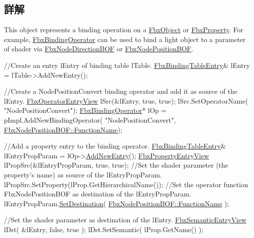 \subsection{詳解}
This object represents a binding operation on a \hyperlink{class_fbx_object}{Fbx\+Object} or \hyperlink{class_fbx_property}{Fbx\+Property}. For example, \hyperlink{class_fbx_binding_operator}{Fbx\+Binding\+Operator} can be used to bind a light object to a parameter of shader via \hyperlink{class_fbx_node_direction_b_o_f}{Fbx\+Node\+Direction\+B\+OF} or \hyperlink{class_fbx_node_position_b_o_f}{Fbx\+Node\+Position\+B\+OF}. 
\begin{DoxyCode}
\textcolor{comment}{//Create an entry lEntry of binding table lTable.}
\hyperlink{class_fbx_binding_table_entry}{FbxBindingTableEntry}& lEntry = lTable->AddNewEntry();

\textcolor{comment}{//Create a NodePositionConvert binding operator and add it as source of the lEntry.}
\hyperlink{class_fbx_operator_entry_view}{FbxOperatorEntryView} lSrc(&lEntry, \textcolor{keyword}{true}, \textcolor{keyword}{true});
lSrc.SetOperatorName( \textcolor{stringliteral}{"NodePositionConvert"});
\hyperlink{class_fbx_binding_operator}{FbxBindingOperator}* lOp = pImpl.AddNewBindingOperator( \textcolor{stringliteral}{"NodePositionConvert"}, 
      \hyperlink{class_fbx_node_position_b_o_f_aaa0c4610384d1dbb4e566bad44c356ee}{FbxNodePositionBOF::FunctionName});

\textcolor{comment}{//Add a property entry to the binding operator.}
\hyperlink{class_fbx_binding_table_entry}{FbxBindingTableEntry}& lEntryPropParam = lOp->\hyperlink{class_fbx_binding_table_base_a2ebf180e80538abf0e6512a8ca30ee10}{AddNewEntry}();
\hyperlink{class_fbx_property_entry_view}{FbxPropertyEntryView} lPropSrc(&lEntryPropParam, \textcolor{keyword}{true}, \textcolor{keyword}{true});
\textcolor{comment}{//Set the shader parameter (the property's name) as source of the lEntryPropParam.}
lPropSrc.SetProperty(lProp.GetHierarchicalName());
\textcolor{comment}{//Set the operator function FbxNodePositionBOF as destination of the lEntryPropParam.}
lEntryPropParam.\hyperlink{class_fbx_binding_table_entry_aaa49a62bd197febfb6052f3efa50eaf3}{SetDestination}( \hyperlink{class_fbx_node_position_b_o_f_aaa0c4610384d1dbb4e566bad44c356ee}{FbxNodePositionBOF::FunctionName}
       );

\textcolor{comment}{//Set the shader parameter as destination of the lEntry.}
\hyperlink{class_fbx_semantic_entry_view}{FbxSemanticEntryView} lDst( &lEntry, \textcolor{keyword}{false}, \textcolor{keyword}{true} );
lDst.SetSemantic( lProp.GetName() );
\end{DoxyCode}



